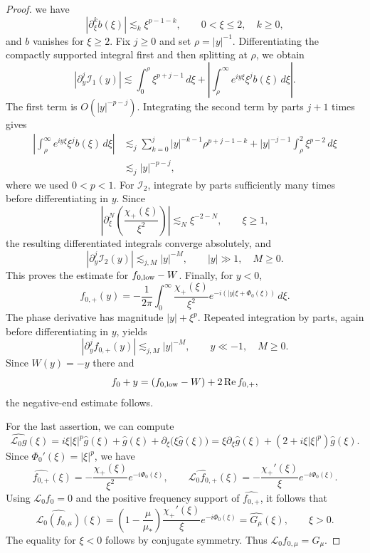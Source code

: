 \documentclass[11pt]{amsart}
\theoremstyle{definition}
\theoremstyle{remark}
\numberwithin{equation}{section}
\newcommand{\mc}[1]{\mathcal{#1}}
\begin{document}
\begin{proof}
    we have
    \[|\partial_\xi^k b(\xi)|\lesssim_k\xi^{p-1-k},\qquad 0<\xi\leq2,\quad k\geq0,\]
    and $b$ vanishes for $\xi\geq2$.
    Fix $j\geq0$ and set $\rho=|y|^{-1}$. Differentiating the compactly supported integral first and then splitting at $\rho$, we obtain
    \[
        |\partial_y^j\mc{I}_1(y)|
        \lesssim\int_0^\rho\xi^{p+j-1}\,d\xi
        +\left|\int_\rho^\infty e^{iy\xi}\xi^jb(\xi)\,d\xi\right|.
    \]
    The first term is $O(|y|^{-p-j})$. Integrating the second term by parts $j+1$ times gives
    \begin{align*}
        \left|\int_\rho^\infty e^{iy\xi}\xi^jb(\xi)\,d\xi\right|
        &\lesssim_j\sum_{k=0}^{j}|y|^{-k-1}\rho^{p+j-1-k}
        +|y|^{-j-1}\int_\rho^2\xi^{p-2}\,d\xi\\
        &\lesssim_j |y|^{-p-j},
    \end{align*}
    where we used $0<p<1$.
    For $\mc{I}_2$, integrate by parts sufficiently many times before differentiating in $y$. Since
    \[
        \left|\partial_\xi^N\left(\frac{\chi_+(\xi)}{\xi^2}\right)\right|
        \lesssim_N\xi^{-2-N},\qquad \xi\geq1,
    \]
    the resulting differentiated integrals converge absolutely, and
    \[|\partial_y^j\mc{I}_2(y)|\lesssim_{j,M}|y|^{-M},\qquad |y|\gg1,\quad M\geq0.\]
    This proves the estimate for $f_{0,\textup{low}}-W$.
    Finally, for $y<0$,
    \[
        f_{0,+}(y)=-\frac1{2\pi}\int_0^\infty
        \frac{\chi_+(\xi)}{\xi^2}e^{-i(|y|\xi+\Phi_0(\xi))}\,d\xi.
    \]
    The phase derivative has magnitude $|y|+\xi^p$. Repeated integration by parts, again before differentiating in $y$, yields
    \[|\partial_y^j f_{0,+}(y)|\lesssim_{j,M}|y|^{-M},\qquad y\ll-1,\quad M\geq0.\]
    Since $W(y)=-y$ there and
    \[f_0+y=(f_{0,\textup{low}}-W)+2\operatorname{Re}f_{0,+},\]
    the negative-end estimate follows. \par
    For the last assertion, we can compute 
    \[\widehat{\mc{L}_0g}(\xi) = i\xi|\xi|^p\widehat{g}(\xi)+\widehat{g}(\xi)+\partial_\xi\bigl(\xi\widehat{g}(\xi)\bigr) = \xi\partial_\xi\widehat{g}(\xi)+(2+i\xi|\xi|^p)\widehat{g}(\xi).\]
    Since $\Phi_0'(\xi)=|\xi|^p$, we have
    \[\widehat{f_{0,+}}(\xi)=-\frac{\chi_+(\xi)}{\xi^2}e^{-i\Phi_0(\xi)}, \qquad \widehat{\mc{L}_0f_{0,+}}(\xi)=-\frac{\chi_+'(\xi)}{\xi}e^{-i\Phi_0(\xi)}.\]
    Using $\mc{L}_0f_0=0$ and the positive frequency support of $\widehat{f_{0,+}}$, it follows that
    \[\widehat{\mc{L}_0(f_{0,\mu})}(\xi)=\left(1-\frac{\mu}{\mu_*}\right)\frac{\chi_+'(\xi)}{\xi}e^{-i\Phi_0(\xi)}=\widehat{G_\mu}(\xi), \qquad \xi>0.\]
    The equality for $\xi<0$ follows by conjugate symmetry. Thus $\mc{L}_0f_{0,\mu}=G_\mu$.
\end{proof}
\end{document}
